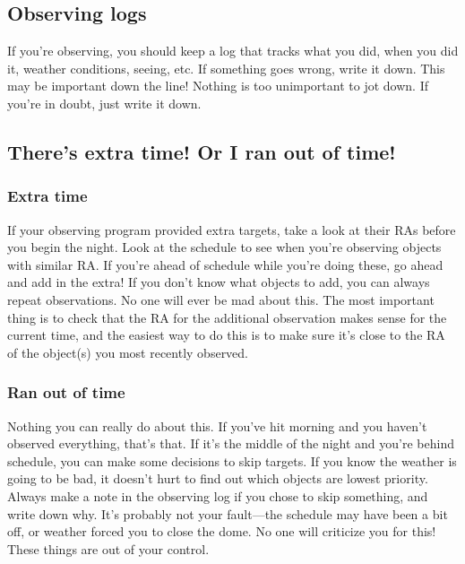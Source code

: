 


\subsection{Observing logs}
If you're observing, you should keep a log that tracks what you did, when you did it, weather conditions, seeing, etc. If something goes wrong, write it down. This may be important down the line! Nothing is too unimportant to jot down. If you're in doubt, just write it down. 

\subsection{There's extra time! Or I ran out of time!}
\subsubsection{Extra time}
If your observing program provided extra targets, take a look at their RAs before you begin the night. Look at the schedule to see when you're observing objects with similar RA. If you're ahead of schedule while you're doing these, go ahead and add in the extra! If you don't know what objects to add, you can always repeat observations. No one will ever be mad about this. The most important thing is to check that the RA for the additional observation makes sense for the current time, and the easiest way to do this is to make sure it's close to the RA of the object(s) you most recently observed. 

\subsubsection{Ran out of time}
Nothing you can really do about this. If you've hit morning and you haven't observed everything, that's that. If it's the middle of the night and you're behind schedule, you can make some decisions to skip targets. If you know the weather is going to be bad, it doesn't hurt to find out which objects are lowest priority. Always make a note in the observing log if you chose to skip something, and write down why. It's probably not your fault---the schedule may have been a bit off, or weather forced you to close the dome. No one will criticize you for this! These things are out of your control. 

